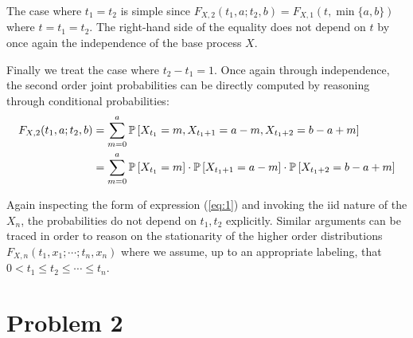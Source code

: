 \documentclass[12pt]{article}%
\begin{document}
\begin{enumerate}
        The case where $t_1 = t_2$ is simple since $F_{X,2}(t_1,a;t_2,b) = F_{X,1}(t, \min\{a,b\})$ where $t = t_{1} = t_{2}$. The right-hand side of the equality does not depend on $t$ by once again the independence of the base process $X$.

        Finally we treat the case where $t_2-t_{1} = 1$. Once again through independence, the second order joint probabilities can be directly computed by reasoning through conditional probabilities:
%
\begin{equation}
  \label{eq:1}
  \begin{split}
    F_{X,2}(t_1,a;t_2,b) & = \sum_{m = 0}^a \mathbb{P}\left[X_{t_1} = m, X_{t_{1}+1} = a -m, X_{t_{1}+ 2} = b - a + m\right] \\
    & = \sum_{m = 0}^a \mathbb{P}\left[X_{t_1} = m\right] \cdot \mathbb{P}\left[ X_{t_{1}+1} = a -m\right] \cdot \mathbb{P}\left[ X_{t_{1}+ 2} = b - a + m\right]
  \end{split}
\end{equation}


        Again inspecting the form of expression (\ref{eq:1}) and invoking the iid nature of the $X_n$, the probabilities do not depend on $t_{1},t_{2}$ explicitly. Similar arguments can be traced in order to reason on the stationarity of the higher order distributions $F_{{X,n}}(t_1,x_1;\cdots;t_n,x_n)$  where we assume, up to an appropriate labeling, that $0 < t_{1} \leq t_{2} \leq \cdots \leq t_{n}$.
\end{enumerate}

\section{Problem 2}
\label{sec:problem-2}
\end{document}
